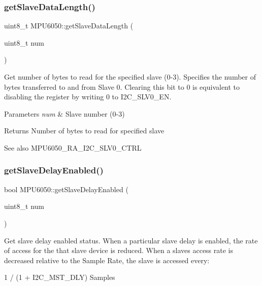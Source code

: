 \subsubsection{\texorpdfstring{getSlaveDataLength()}{getSlaveDataLength()}}
{\footnotesize\ttfamily uint8\+\_\+t M\+P\+U6050\+::get\+Slave\+Data\+Length (\begin{DoxyParamCaption}\item[{uint8\+\_\+t}]{num }\end{DoxyParamCaption})}

Get number of bytes to read for the specified slave (0-\/3). Specifies the number of bytes transferred to and from Slave 0. Clearing this bit to 0 is equivalent to disabling the register by writing 0 to I2\+C\+\_\+\+S\+L\+V0\+\_\+\+EN. 
\begin{DoxyParams}{Parameters}
{\em num} & Slave number (0-\/3) \\
\hline
\end{DoxyParams}
\begin{DoxyReturn}{Returns}
Number of bytes to read for specified slave 
\end{DoxyReturn}
\begin{DoxySeeAlso}{See also}
M\+P\+U6050\+\_\+\+R\+A\+\_\+\+I2\+C\+\_\+\+S\+L\+V0\+\_\+\+C\+T\+RL 
\end{DoxySeeAlso}
\mbox{\label{class_m_p_u6050_ae84fd795630f9ab5e8d6b19a616a11ce}} 
\subsubsection{\texorpdfstring{getSlaveDelayEnabled()}{getSlaveDelayEnabled()}}
{\footnotesize\ttfamily bool M\+P\+U6050\+::get\+Slave\+Delay\+Enabled (\begin{DoxyParamCaption}\item[{uint8\+\_\+t}]{num }\end{DoxyParamCaption})}

Get slave delay enabled status. When a particular slave delay is enabled, the rate of access for the that slave device is reduced. When a slave\textquotesingle{}s access rate is decreased relative to the Sample Rate, the slave is accessed every\+: \begin{DoxyVerb}1 / (1 + I2C_MST_DLY) Samples
\end{DoxyVerb}


